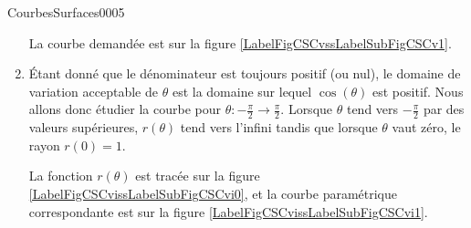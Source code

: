 \begin{corrige}{CourbesSurfaces0005}
\begin{enumerate}
			La courbe demandée est sur la figure \ref{LabelFigCSCvssLabelSubFigCSCv1}.

		\item

\newcommand{\CaptionFigCSCvi}{La courbe de l'exercice \ref{exoCourbesSurfaces0005}.\ref{CSCv}.}



			Étant donné que le dénominateur est toujours positif (ou nul), le domaine de variation acceptable de $\theta$ est la domaine sur lequel $\cos(\theta)$ est positif. Nous allons donc étudier la courbe pour $\theta\colon -\frac{ \pi }{2}\to \frac{ \pi }{2}$. Lorsque $\theta$ tend vers $-\frac{ \pi }{2}$ par des valeurs supérieures, $r(\theta)$ tend vers l'infini tandis que lorsque $\theta$ vaut zéro, le rayon $r(0)=1$.

		La fonction $r(\theta)$ est tracée sur la figure \ref{LabelFigCSCvissLabelSubFigCSCvi0}, et la courbe paramétrique correspondante est sur la figure \ref{LabelFigCSCvissLabelSubFigCSCvi1}.

	\end{enumerate}
	
\end{corrige}
